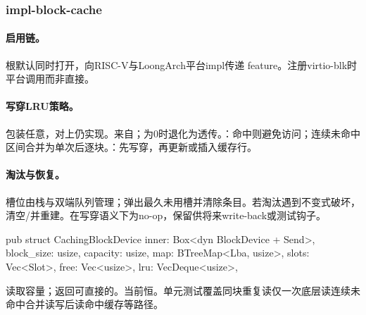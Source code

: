 
\subsubsection{impl-block-cache}

\paragraph{启用链。}根默认同时打开，向RISC-V与LoongArch平台impl传递 feature。注册virtio-blk时平台调用而非直接。

\paragraph{写穿LRU策略。}包装任意，对上仍实现。来自；为0时退化为透传。：命中则避免访问；连续未命中区间合并为单次后逐块。：先写穿，再更新或插入缓存行。

\paragraph{淘汰与恢复。}槽位由栈与双端队列管理；弹出最久未用槽并清除条目。若淘汰遇到不变式破坏，清空/并重建。在写穿语义下为no-op，保留供将来write-back或测试钩子。

\begin{rustcode}
pub struct CachingBlockDevice {
    inner: Box<dyn BlockDevice + Send>,
    block_size: usize,
    capacity: usize,
    map: BTreeMap<Lba, usize>,
    slots: Vec<Slot>,
    free: Vec<usize>,
    lru: VecDeque<usize>,
}
\end{rustcode}

读取容量；返回可直接的。当前恒。单元测试覆盖同块重复读仅一次底层读连续未命中合并读写后读命中缓存等路径。
